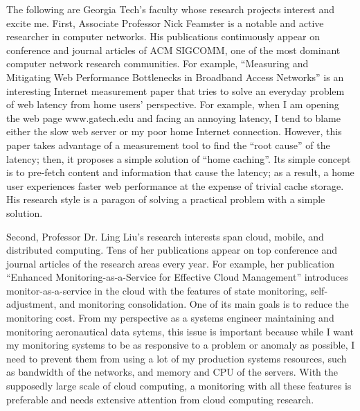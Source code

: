 \documentclass[a4paper,10pt]{report}
\newcommand{\uniabbre}{Georgia Tech}
\begin{document}
\vspace{0.2cm}
The following are \uniabbre's faculty whose research projects interest and excite me. First, Associate Professor Nick Feamster is a notable and active researcher in computer networks. His publications continuously appear on conference and journal articles of ACM SIGCOMM, one of the most dominant computer network research communities. For example, ``Measuring and Mitigating Web Performance Bottlenecks in Broadband Access Networks'' is an interesting Internet measurement paper that tries to solve an everyday problem of web latency from home users' perspective. For example, when I am opening the web page www.gatech.edu and facing an annoying latency, I tend to blame either the slow web server or my poor home Internet connection. However, this paper takes advantage of a measurement tool to find the ``root cause'' of the latency; then, it proposes a simple solution of ``home caching''. Its simple concept is to pre-fetch content and information that cause the latency; as a result, a home user experiences faster web performance at the expense of trivial cache storage. His research style is a paragon of solving a practical problem with a simple solution. 

\vspace{0.2cm}
Second, Professor Dr. Ling Liu's research interests span cloud, mobile, and distributed computing. Tens of her publications appear on top conference and journal articles of the research areas every year. For example, her publication ``Enhanced Monitoring-as-a-Service for Effective Cloud Management'' introduces monitor-as-a-service in the cloud with the features of state monitoring, self-adjustment, and monitoring consolidation. One of its main goals is to reduce the monitoring cost. From my perspective as a systems engineer maintaining and monitoring aeronautical data sytems, this issue is important because while I want my monitoring systems to be as responsive to a problem or anomaly as possible, I need to prevent them from using a lot of my production systems resources, such as bandwidth of the networks, and memory and CPU of the servers. With the supposedly large scale of cloud computing, a monitoring with all these features is preferable and needs extensive attention from cloud computing research.
\end{document}

